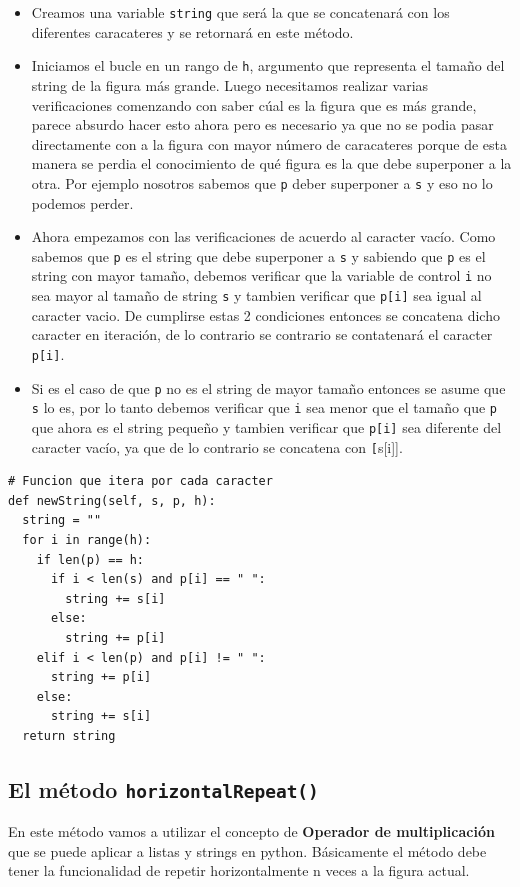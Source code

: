 \documentclass[10pt, a4paper]{article}
\newcommand{\mintpython}[1]{\texttt{#1}}
\begin{document}
\begin{itemize}
  \item Creamos una variable \mintpython{string} que será la que se concatenará con los diferentes caracateres y se retornará en este método.
  \item Iniciamos el bucle en un rango de \mintpython{h}, argumento que representa el tamaño del string de la figura más grande. Luego necesitamos realizar varias verificaciones comenzando con saber cúal es la figura que es más grande, parece absurdo hacer esto ahora pero es necesario ya que no se podia pasar directamente con a la figura con mayor número de caracateres porque de esta manera se perdia el conocimiento de qué figura es la que debe superponer a la otra. Por ejemplo nosotros sabemos que \mintpython{p} deber superponer a \mintpython{s} y eso no lo podemos perder.
  \item Ahora empezamos con las verificaciones de acuerdo al caracter vacío. Como sabemos que \mintpython{p} es el string que debe superponer a \mintpython{s} y sabiendo que \mintpython{p} es el string con mayor tamaño, debemos verificar que la variable de control \mintpython{i} no sea mayor al tamaño de string \mintpython{s} y tambien verificar que \mintpython{p[i]} sea igual al caracter vacio. De cumplirse estas 2 condiciones entonces se concatena dicho caracter en iteración, de lo contrario se contrario se contatenará el caracter \mintpython{p[i]}.

  \item Si es el caso de que \mintpython{p} no es el string de mayor tamaño entonces se asume que \mintpython{s} lo es, por lo tanto debemos verificar que \mintpython{i} sea menor que el tamaño que \mintpython{p} que ahora es el string pequeño y tambien verificar que \mintpython{p[i]} sea diferente del caracter vacío, ya que de lo contrario se concatena con \mintpython[s[i]].
\end{itemize}

\begin{verbatim}
# Funcion que itera por cada caracter
def newString(self, s, p, h):
  string = ""
  for i in range(h):
    if len(p) == h:
      if i < len(s) and p[i] == " ":
        string += s[i]
      else:
        string += p[i]
    elif i < len(p) and p[i] != " ":
      string += p[i]
    else:
      string += s[i]
  return string
\end{verbatim}

\subsection{El método \mintpython{horizontalRepeat()}}
En este método vamos a utilizar el concepto de \textbf{Operador de multiplicación} que se puede aplicar a listas y strings en python. Básicamente el método debe tener la funcionalidad de repetir horizontalmente n veces a la figura actual.
\end{document}
